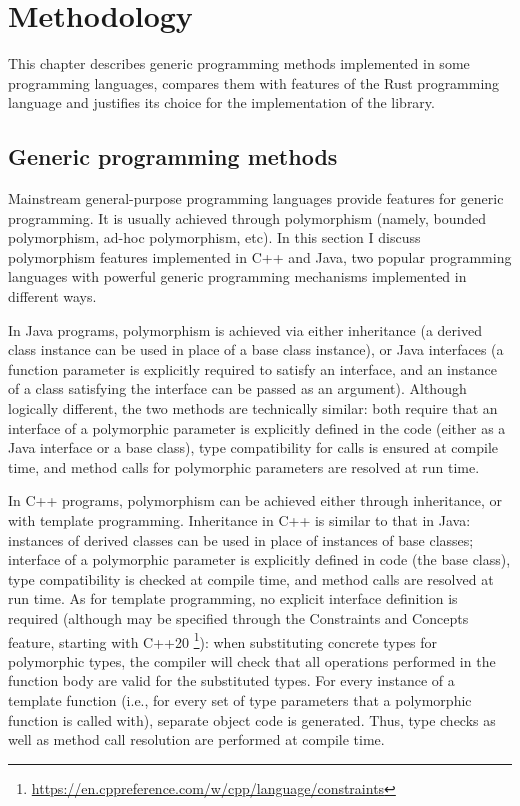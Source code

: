 \chapter{Methodology}
\label{chap:met}

This chapter describes generic programming methods implemented in some programming languages,
compares them with features of the Rust programming language and justifies its choice for
the implementation of the library.

\section{Generic programming methods}


Mainstream general-purpose programming languages provide features for generic programming. It is
usually achieved through polymorphism (namely, bounded polymorphism, ad-hoc polymorphism, etc).
In this section I discuss polymorphism features implemented in C++ and Java, two popular
programming languages with powerful generic programming mechanisms implemented in different ways.

In Java programs, polymorphism is achieved via either inheritance (a derived class instance
can be used in place of a base class instance), or
Java interfaces (a function parameter is explicitly required to satisfy an interface, and an
instance of a class satisfying the interface can be passed as an argument).
Although logically different, the two methods are technically similar: both require that
an interface of a polymorphic parameter is explicitly defined in the code (either as a
Java interface or a base class), type compatibility for calls is ensured at compile time,
and method calls for polymorphic parameters are resolved at run time.

In C++ programs, polymorphism can be achieved either through inheritance, or with template
programming. Inheritance in C++ is similar to that in Java: instances of derived classes can
be used in place of instances of base classes; interface of a polymorphic parameter is
explicitly defined in code (the base class), type compatibility is checked
at compile time, and method calls are resolved at run time. As for template programming,
no explicit interface definition is required (although may be specified through the
Constraints and Concepts feature, starting with C++20
\footnote{\url{https://en.cppreference.com/w/cpp/language/constraints}}):
when substituting concrete types for polymorphic types, the compiler will check that all
operations performed in the function body are valid for the substituted types. For every
instance of a template function (i.e., for every set of type parameters that a polymorphic
function is called with), separate object code is generated. Thus, type checks as well as
method call resolution are performed at compile time.

